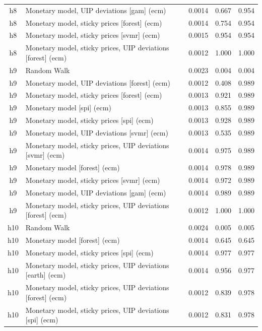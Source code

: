 \begin{ThreePartTable}
\begin{longtable}[t]{cp{5.5cm}ccc}
h8 & \raggedright Monetary model, UIP deviations [gam] (ecm) & 0.0014 & 0.667 & 0.954\\
h8 & \raggedright Monetary model, sticky prices [forest] (ecm) & 0.0014 & 0.754 & 0.954\\
h8 & \raggedright Monetary model, sticky prices [svmr] (ecm) & 0.0015 & 0.954 & 0.954\\
h8 & \raggedright Monetary model, sticky prices, UIP deviations [forest] (ecm) & 0.0012 & 1.000 & 1.000\\
\addlinespace
h9 & \raggedright Random Walk & 0.0023 & 0.004 & 0.004\\
h9 & \raggedright Monetary model, UIP deviations [forest] (ecm) & 0.0012 & 0.408 & 0.989\\
h9 & \raggedright Monetary model, sticky prices [forest] (ecm) & 0.0013 & 0.921 & 0.989\\
h9 & \raggedright Monetary model [spi] (ecm) & 0.0013 & 0.855 & 0.989\\
h9 & \raggedright Monetary model, sticky prices [spi] (ecm) & 0.0013 & 0.928 & 0.989\\
h9 & \raggedright Monetary model, UIP deviations [svmr] (ecm) & 0.0013 & 0.535 & 0.989\\
h9 & \raggedright Monetary model, sticky prices, UIP deviations [svmr] (ecm) & 0.0014 & 0.975 & 0.989\\
h9 & \raggedright Monetary model [forest] (ecm) & 0.0014 & 0.978 & 0.989\\
h9 & \raggedright Monetary model, sticky prices [svmr] (ecm) & 0.0014 & 0.972 & 0.989\\
h9 & \raggedright Monetary model, UIP deviations [gam] (ecm) & 0.0014 & 0.989 & 0.989\\
h9 & \raggedright Monetary model, sticky prices, UIP deviations [forest] (ecm) & 0.0012 & 1.000 & 1.000\\
\addlinespace
h10 & \raggedright Random Walk & 0.0024 & 0.005 & 0.005\\
h10 & \raggedright Monetary model [forest] (ecm) & 0.0014 & 0.645 & 0.645\\
h10 & \raggedright Monetary model, sticky prices [spi] (ecm) & 0.0014 & 0.977 & 0.977\\
h10 & \raggedright Monetary model, sticky prices, UIP deviations [earth] (ecm) & 0.0014 & 0.956 & 0.977\\
h10 & \raggedright Monetary model, sticky prices, UIP deviations [forest] (ecm) & 0.0012 & 0.839 & 0.978\\
h10 & \raggedright Monetary model, sticky prices, UIP deviations [spi] (ecm) & 0.0012 & 0.831 & 0.978\\

\end{longtable}
\end{ThreePartTable}

